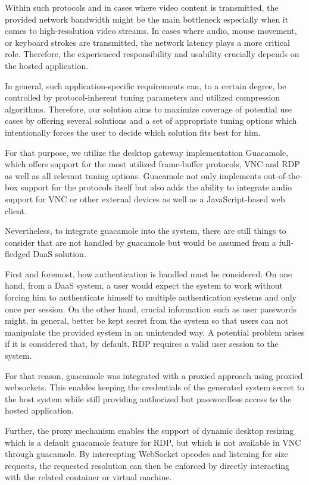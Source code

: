 \documentclass[runningheads]{llncs}
\begin{document}
Within such protocols and in cases where video content is transmitted,
the provided network bandwidth might be the main bottleneck
especially when it comes to high-resolution video streams.
In cases where audio, mouse movement, or keyboard strokes are transmitted,
the network latency plays a more critical role.
Therefore, the experienced responsibility and usability
crucially depends on the hosted application.

In general, such application-specific requirements can, to a certain degree, be controlled
by protocol-inherent tuning parameters and utilized compression algorithms.
Therefore, our solution aims to maximize coverage of potential use cases
by offering several solutions and a set of appropriate tuning options
which intentionally forces the user to decide
which solution fits best for him.

For that purpose, we utilize the desktop gateway implementation Guacamole,
which offers support for the most utilized frame-buffer protocols, VNC and RDP
as well as all relevant tuning options.
Guacamole not only implements out-of-the-box support for the protocols itself
but also adds the ability to integrate audio support for VNC or other external devices
as well as a JavaScript-based web client.

Nevertheless, to integrate guacamole into the system,
there are still things to consider that are not handled by guacamole
but would be assumed from a full-fledged DaaS solution.

First and foremost, how authentication is handled must be considered.
On one hand, from a DaaS system, a user would expect the system to work
without forcing him to authenticate himself
to multiple authentication systems and only once per session.
On the other hand, crucial information such as user passwords
might, in general, better be kept secret from the system
so that users can not manipulate the provided system in an unintended way.
A potential problem arises if it is considered
that, by default, RDP requires a valid user session to the system.

For that reason, guacamole was integrated with a proxied approach using proxied websockets.
This enables keeping the credentials of the generated system secret to the host system
while still providing authorized but passwordless access to the hosted application.

Further, the proxy mechanism enables the support of dynamic desktop resizing
which is a default guacamole feature for RDP,
but which is not available in VNC through guacamole.
By intercepting WebSocket opcodes and listening for size requests,
the requested resolution can then be enforced
by directly interacting with the related container or virtual machine.
\end{document}
